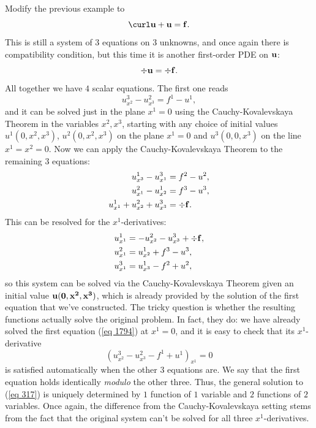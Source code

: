 \begin{example}
    Modify the previous example to 
    \[\curl \bf{u}+\bf{u}=\bf{f}.\label{eq 317}\]
    This is still a system of $3$ equations on $3$ unknowns, and once again there is compatibility condition, but this time it is another first-order PDE on $\bf{u}$:
    \[\div\bf{u}=\div\bf{f}.\]
    All together we have $4$ scalar equations. The first one reads 
    \[u^3_{x^2}-u^2_{x^3}=f^1-u^1,\label{eq 1794}\] 
    and it can be solved just in the plane $x^1=0$ using the Cauchy-Kovalevskaya Theorem in the variables $x^2,x^3$, starting with any choice of initial values $u^1(0,x^2,x^3)$, $u^2(0,x^2,x^3)$ on the plane $x^1=0$ and $u^3(0,0,x^3)$ on the line $x^1=x^2=0$. Now we can apply the Cauchy-Kovalevskaya Theorem to the remaining $3$ equations:
    \begin{align}
        u^1_{x^3}-u^3_{x^1}&=f^2-u^2,\\
        u^2_{x^1}-u^1_{x^2}&=f^3-u^3,\\
        u^1_{x^1}+u^2_{x^2}+u^3_{x^3}&=\div\bf{f}.
    \end{align}
    This can be resolved for the $x^1$-derivatives:
    \begin{align}
        u^1_{x^1}&=-u^2_{x^2}-u^3_{x^3}+\div\bf{f},\\
        u^2_{x^1}&=u^1_{x^2}+f^3-u^3,\\
        u^3_{x^1}&=u^1_{x^3}-f^2+u^2,
    \end{align}
    so this system can be solved via the Cauchy-Kovalevskaya Theorem given an initial value $\bf{u}(0,x^2,x^3)$, which is already provided by the solution of the first equation that we've constructed. The tricky question is whether the resulting functions actually solve the original problem. In fact, they do: we have already solved the first equation (\ref{eq 1794}) at $x^1=0$, and it is easy to check that its $x^1$-derivative
    \[(u^3_{x^2}-u^2_{x^3}-f^1+u^1)_{x^1}=0\]
    is satisfied automatically when the other $3$ equations are. We say that the first equation holds identically \emph{modulo} the other three. Thus, the general solution to (\ref{eq 317}) is uniquely determined by $1$ function of $1$ variable and $2$ functions of $2$ variables. Once again, the difference from the Cauchy-Kovalevskaya setting stems from the fact that the original system can't be solved for all three $x^1$-derivatives.
\end{example}

